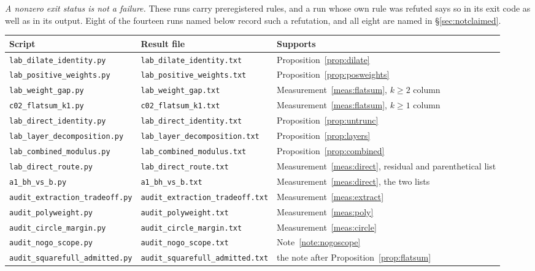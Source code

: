 \documentclass[11pt,a4paper]{article}
\theoremstyle{plain}
\theoremstyle{definition}
\theoremstyle{remark}
\begin{document}
\emph{A nonzero exit status is not a failure.} These runs carry
preregistered rules, and a run whose own rule was refuted says so in its
exit code as well as in its output. Eight of the fourteen runs named
below record such a refutation, and all eight are named in
\S\ref{sec:notclaimed}.

\begin{center}
\small
\begin{tabular}{llp{3.8cm}}
\hline
Script & Result file & Supports\\
\hline
\texttt{lab\_dilate\_identity.py} & \texttt{lab\_dilate\_identity.txt}
 & Proposition~\ref{prop:dilate}\\
\texttt{lab\_positive\_weights.py} & \texttt{lab\_positive\_weights.txt}
 & Proposition~\ref{prop:posweights}\\
\texttt{lab\_weight\_gap.py} & \texttt{lab\_weight\_gap.txt}
 & Measurement~\ref{meas:flatsum}, $k\ge2$ column\\
\texttt{c02\_flatsum\_k1.py} & \texttt{c02\_flatsum\_k1.txt}
 & Measurement~\ref{meas:flatsum}, $k\ge1$ column\\
\texttt{lab\_direct\_identity.py} & \texttt{lab\_direct\_identity.txt}
 & Proposition~\ref{prop:untrunc}\\
\texttt{lab\_layer\_decomposition.py} &
 \texttt{lab\_layer\_decomposition.txt} & Proposition~\ref{prop:layers}\\
\texttt{lab\_combined\_modulus.py} & \texttt{lab\_combined\_modulus.txt}
 & Proposition~\ref{prop:combined}\\
\texttt{lab\_direct\_route.py} & \texttt{lab\_direct\_route.txt}
 & Measurement~\ref{meas:direct}, residual and parenthetical list\\
\texttt{a1\_bh\_vs\_b.py} & \texttt{a1\_bh\_vs\_b.txt}
 & Measurement~\ref{meas:direct}, the two lists\\
\texttt{audit\_extraction\_tradeoff.py} &
 \texttt{audit\_extraction\_tradeoff.txt} & Measurement~\ref{meas:extract}\\
\texttt{audit\_polyweight.py} & \texttt{audit\_polyweight.txt}
 & Measurement~\ref{meas:poly}\\
\texttt{audit\_circle\_margin.py} & \texttt{audit\_circle\_margin.txt}
 & Measurement~\ref{meas:circle}\\
\texttt{audit\_nogo\_scope.py} & \texttt{audit\_nogo\_scope.txt}
 & Note~\ref{note:nogoscope}\\
\texttt{audit\_squarefull\_admitted.py} &
 \texttt{audit\_squarefull\_admitted.txt} & the note after
 Proposition~\ref{prop:flatsum}\\
\hline
\end{tabular}
\end{center}
\end{document}

